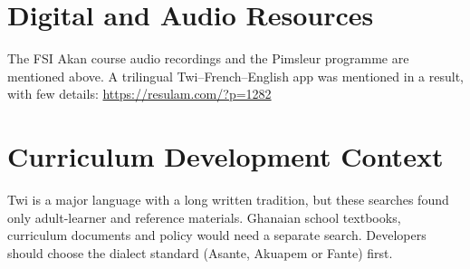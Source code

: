 \documentclass[12pt]{article}
\begin{document}
\section{Digital and Audio Resources}
The FSI Akan course audio recordings and the Pimsleur programme are mentioned above. A trilingual Twi--French--English app was mentioned in a result, with few details: \url{https://resulam.com/?p=1282}

\section{Curriculum Development Context}
Twi is a major language with a long written tradition, but these searches found only adult-learner and reference materials. Ghanaian school textbooks, curriculum documents and policy would need a separate search. Developers should choose the dialect standard (Asante, Akuapem or Fante) first.
\end{document}
